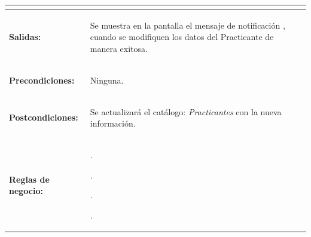 \begin{table}[H]
\begin{tabular}{| l | p{12 cm} |}
\begin{compactitem}
		\end{compactitem} \\
\hline
\textbf{Salidas:} & \vspace{-2mm}	%
					\begin{compactitem}
						\setlength\itemsep{-0.25em}
							\item Se muestra en la pantalla \nameref{pant:IUE04.1} el mensaje de notificación \nameref{msj:MSG01}, cuando se modifiquen los datos del Practicante de manera exitosa.
						\end{compactitem}\\
\hline
\textbf{Precondiciones:} & 	\vspace{-2mm}	%
							\begin{compactitem}
								\setlength\itemsep{-0.25em}
								\item Ninguna.
							\end{compactitem}\\
\hline
\textbf{Postcondiciones:} & \vspace{-2mm}	%
							\begin{compactitem}
								\item Se actualizará el catálogo: \textit{Practicantes} con la nueva información.
							\end{compactitem}\\
							
\hline
\textbf{Reglas de negocio:} & \vspace{-2mm}	%
							\begin{compactitem}
								\item \nameref{rn:RNR01}.
								\item \nameref{rn:RNR03}.
								\item \nameref{rn:RNR04}.
								\item \nameref{rn:RNR07}.
							\end{compactitem}\\							
\hline
\end{tabular}
\end{table} 

\clearpage

